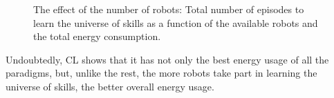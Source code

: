 \begin{figure}[!t]
{	\label{fig:total_energy_per_n_robots}}
	\hspace*{\fill}
	\caption[] {\label{fig:final_results} The effect of the number of robots:  Total number of episodes to learn the universe of skills as a function of the available robots and  the total energy consumption.}
\end{figure}
Undoubtedly, CL shows that it has not only the best energy usage of all the paradigms, but, unlike the rest, the more robots take part in learning the universe of skills, the better overall energy usage.